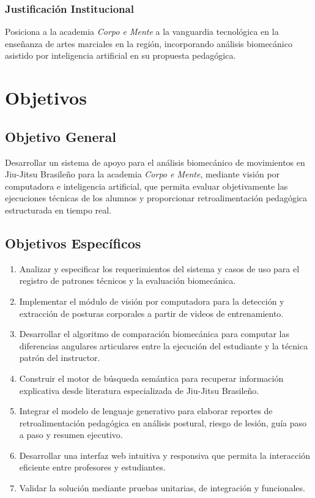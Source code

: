 \subsubsection{Justificación Institucional}
Posiciona a la academia \textit{Corpo e Mente} a la vanguardia tecnológica en la enseñanza de artes marciales en la región, incorporando análisis biomecánico asistido por inteligencia artificial en su propuesta pedagógica.

\newpage

\section{Objetivos}

\subsection{Objetivo General}
Desarrollar un sistema de apoyo para el análisis biomecánico de movimientos en Jiu-Jitsu Brasileño para la academia \textit{Corpo e Mente}, mediante visión por computadora e inteligencia artificial, que permita evaluar objetivamente las ejecuciones técnicas de los alumnos y proporcionar retroalimentación pedagógica estructurada en tiempo real.

\subsection{Objetivos Específicos}
\begin{enumerate}
    \item Analizar y especificar los requerimientos del sistema y casos de uso para el registro de patrones técnicos y la evaluación biomecánica.
    \item Implementar el módulo de visión por computadora para la detección y extracción de posturas corporales a partir de videos de entrenamiento.
    \item Desarrollar el algoritmo de comparación biomecánica para computar las diferencias angulares articulares entre la ejecución del estudiante y la técnica patrón del instructor.
    \item Construir el motor de búsqueda semántica para recuperar información explicativa desde literatura especializada de Jiu-Jitsu Brasileño.
    \item Integrar el modelo de lenguaje generativo para elaborar reportes de retroalimentación pedagógica en análisis postural, riesgo de lesión, guía paso a paso y resumen ejecutivo.
    \item Desarrollar una interfaz web intuitiva y responsiva que permita la interacción eficiente entre profesores y estudiantes.
    \item Validar la solución mediante pruebas unitarias, de integración y funcionales.
\end{enumerate}

